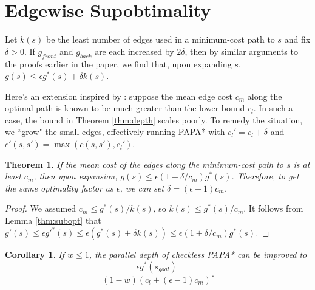\documentclass[letterpaper]{article}
\newtheorem{thm}{Theorem}
\newtheorem{cor}{Corollary}
\begin{document}
\section{Edgewise Supobtimality}

Let $k(s)$ be the least number of edges used in a minimum-cost path to $s$ and fix $\delta > 0$. If $g_{front}$ and $g_{back}$ are each increased by $2\delta$, then by similar arguments to the proofs earlier in the paper, we find that, upon expanding $s$, $g(s) \le \epsilon g^*(s) + \delta k(s)$.

Here's an extension inspired by \cite{klein1997randomized}: suppose the mean edge cost $c_m$ along the optimal path is known to be much greater than the lower bound $c_l$. In such a case, the bound in Theorem \ref{thm:depth} scales poorly. To remedy the situation, we ``grow" the small edges, effectively running PAPA* with $c_l' = c_l + \delta$ and $c'(s,s') = \max(c(s,s'), c_l')$.

\begin{thm}
\label{thm:delta}
If the mean cost of the edges along the minimum-cost path to $s$ is at least $c_m$, then upon expansion, $g(s) \le \epsilon(1+\delta/c_m)g^*(s)$. Therefore, to get the same optimality factor as $\epsilon$, we can set $\delta = (\epsilon-1)c_m$.
\end{thm}

\begin{proof}
We assumed $c_m \le g^*(s) / k(s)$, so $k(s) \le g^*(s) / c_m$.
It follows from Lemma \ref{thm:subopt} that $g'(s) \le \epsilon g'^*(s) \le \epsilon(g^*(s) + \delta k(s)) \le \epsilon(1+\delta/c_m)g^*(s)$.
\end{proof}

\begin{cor}
\label{cor:delta}
If $w \le 1$, the parallel depth of checkless PAPA* can be improved to
\[\frac{\epsilon g^*(s_{goal})}{(1-w)(c_l+(\epsilon-1)c_m)}.\]
\end{cor}



\end{document}
